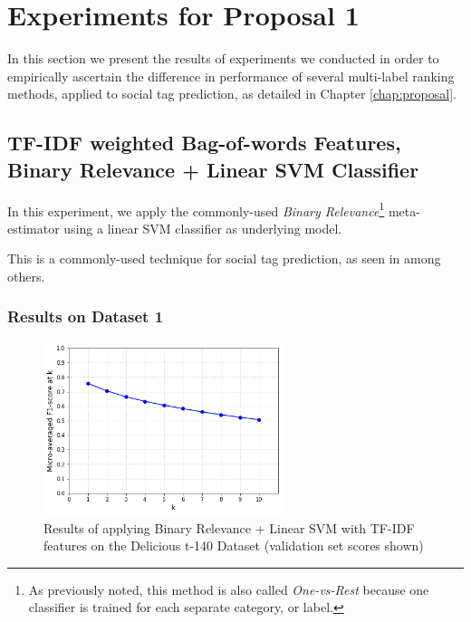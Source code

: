 \section{Experiments for Proposal 1}\label{section:experiment_part_1}

In this section we present the results of experiments we conducted in order to empirically ascertain the difference in performance of several multi-label ranking methods, applied to social tag prediction, as detailed in Chapter \ref{chap:proposal}.

\subsection{TF-IDF weighted Bag-of-words Features, Binary Relevance + Linear SVM Classifier}

In this experiment, we apply the commonly-used \textit{Binary Relevance}\footnote{As previously noted, this method is also called \textit{One-vs-Rest} because one classifier is trained for each separate category, or label.} meta-estimator \citep{tsoumakas_katakis_2007} using a linear SVM classifier as underlying model.

This is a commonly-used technique for social tag prediction, as seen in \cite{chen_etal_2008, goh_etal_2008,illig_etal_2011,tao_yao_2016} among others.

\subsubsection{Results on Dataset 1}

\begin{figure}[H]
    \centering
    \includegraphics[width=7cm]{chapters/05_experiments/images/svm-tf-idf-delicious-20-frac.png}
    \caption{Results of applying Binary Relevance + Linear SVM with TF-IDF features on the Delicious t-140 Dataset (validation set scores shown)}
    \label{fig:ovr_svm_movielens}
\end{figure}

